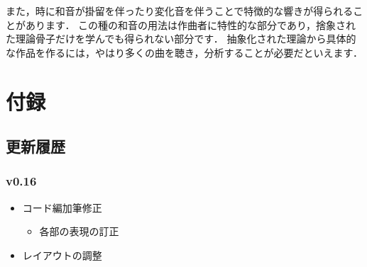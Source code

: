 \documentclass[dvipdfmx,uplatex,b5paper,openany,jbase=12Q,nomag*,textwidth-limit=44%
               ]{gachimuchi}
\begin{document}
また，時に和音が掛留を伴ったり変化音を伴うことで特徴的な響きが得られることがあります．
この種の和音の用法は作曲者に特性的な部分であり，捨象された理論骨子だけを学んでも得られない部分です．
抽象化された理論から具体的な作品を作るには，やはり多くの曲を聴き，分析することが必要だといえます．

\clearpage%
\twocolumn
{}%
\backmatter
\chapter{付録}
\section{更新履歴}
\subsection{v0.16}
\begin{itemize}
  \item コード編加筆修正
  \begin{itemize}
    \item 各部の表現の訂正
  \end{itemize}
  \item レイアウトの調整
\end{itemize}
\end{document}
